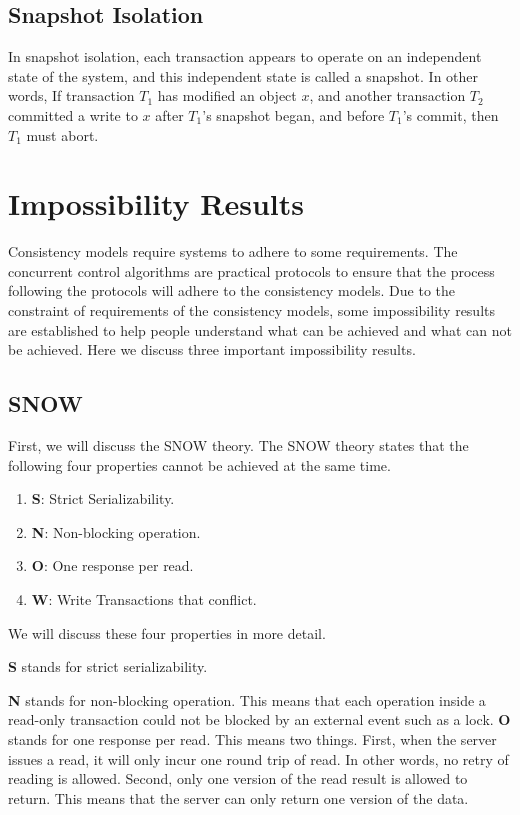 \subsection{Snapshot Isolation}
In snapshot isolation, each transaction appears to operate on an independent state of the system, and this independent state is called a snapshot. In other words, If transaction $T_1$ has modified an object $x$, and another transaction $T_2$ committed a write to $x$ after $T_1$’s snapshot began, and before $T_1$’s commit, then $T_1$ must abort. 
\section{Impossibility Results}
Consistency models require systems to adhere to some requirements. The concurrent control algorithms are practical protocols to ensure that the process following the protocols will adhere to the consistency models. Due to the constraint of requirements of the consistency models, some impossibility results are established to help people understand what can be achieved and what can not be achieved. Here we discuss three important impossibility results. 
\subsection{SNOW}
First, we will discuss the SNOW theory. The SNOW theory states that the following four properties cannot be achieved at the same time.
\begin{enumerate}
    \item \textbf{S}: Strict Serializability.
    \item \textbf{N}: Non-blocking operation.
    \item \textbf{O}: One response per read.
    \item \textbf{W}: Write Transactions that conflict.
\end{enumerate}

We will discuss these four properties in more detail.


\textbf{S} stands for strict serializability.

\textbf{N} stands for non-blocking operation. This means that each operation inside a read-only transaction could not be blocked by an external event such as a lock. 
\textbf{O} stands for one response per read. This means two things. First, when the server issues a read, it will only incur one round trip of read. In other words, no retry of reading is allowed. Second, only one version of the read result is allowed to return. This means that the server can only return one version of the data. 

